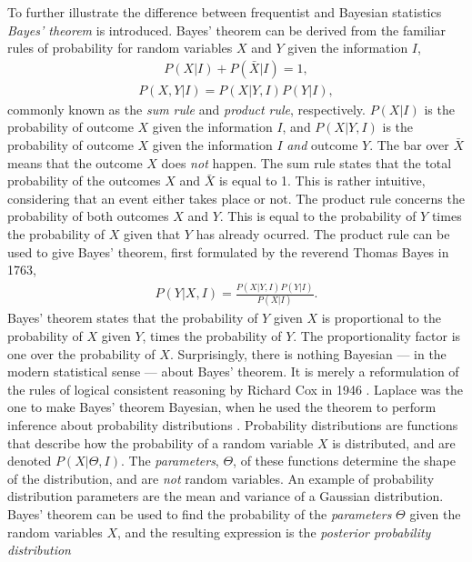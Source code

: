 \documentclass[twoside,english]{uiofysmaster}
\begin{document}
To further illustrate the difference between frequentist and Bayesian statistics \textit{Bayes' theorem} \cite{mr1763essay} is introduced. Bayes' theorem can be derived from the familiar rules of probability for random variables $X$ and $Y$ given the information $I$,
\begin{align}\label{Eq:: gaussian process : Sum rule}
P(X | I) + P(\bar{X} | I) = 1,
\end{align}
\begin{align}
 \label{Eq:: gaussian process : Product rule}
P(X, Y | I) = P(X | Y, I)  P(Y | I),
\end{align} 
commonly known as the \textit{sum rule} and \textit{product rule}, respectively. $P(X|I)$ is the probability of outcome $X$ given the information $I$, and $P(X|Y,I)$ is the probability of outcome $X$ given the information $I$ \textit{and} outcome $Y$. The bar over $\bar{X}$ means that the outcome $X$ does \textit{not} happen. The sum rule states that the total probability of the outcomes $X$ and $\bar{X}$ is equal to 1. This is rather intuitive, considering that an event either takes place or not. The product rule concerns the probability of both outcomes $X$ and $Y$. This is equal to the probability of $Y$ times the probability of $X$ given that $Y$ has already ocurred. The product rule can be used to give Bayes' theorem, first formulated by the reverend Thomas Bayes in 1763,
\begin{align}\label{Eq:: gaussian process : Bayes theorem}
P(Y | X, I) = \frac{P(X | Y, I)  P(Y | I)}{P(X | I)}.
\end{align}
Bayes' theorem states that the probability of $Y$ given $X$ is proportional to the probability of $X$ given $Y$, times the probability of $Y$. The proportionality factor is one over the probability of $X$. Surprisingly, there is nothing Bayesian --- in the modern statistical sense ---  about Bayes' theorem. It is merely a reformulation of the rules of logical consistent reasoning by Richard Cox in 1946 \cite{sivia2006data}. Laplace was the one to make Bayes' theorem Bayesian, when he used the theorem to perform inference about probability distributions \cite{laplace1820theorie}. Probability distributions are functions that describe how the probability of a random variable $X$ is distributed, and are denoted $P(X| \Theta, I)$. The \textit{parameters}, $\Theta$, of these functions determine the shape of the distribution, and are \textit{not} random variables. An example of probability distribution parameters are the mean and variance of a Gaussian distribution. Bayes' theorem can be used to find the probability of the \textit{parameters} $\Theta$ given the random variables $X$, and the resulting expression is the \textit{posterior probability distribution}
\end{document}
